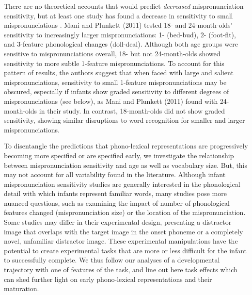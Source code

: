 \documentclass[man]{apa6}
\begin{document}
There are no theoretical accounts that would predict \emph{decreased} mispronunciation sensitivity, but at least one study has found a decrease in sensitivity to small mispronunciations . Mani and Plunkett (2011) tested 18- and 24-month-olds' sensitivity to increasingly larger mispronunciations: 1- (bed-bud), 2- (foot-fit), and 3-feature phonological changes (doll-deal). Although both age groups were sensitive to mispronunciations overall, 18- but not 24-month-olds showed sensitivity to more subtle 1-feature mispronunciations. To account for this pattern of results, the authors suggest that when faced with large and salient mispronunciations, sensitivity to small 1-feature mispronunciations may be obscured, especially if infants show graded sensitivity to different degrees of mispronunciations (see below), as Mani and Plunkett (2011) found with 24-month-olds in their study. In contrast, 18-month-olds did not show graded sensitivity, showing similar disruptions to word recognition for smaller and larger mispronunciations.

To disentangle the predictions that phono-lexical representations are progressively becoming more specified or are specified early, we investigate the relationship between mispronunciation sensitivity and age as well as vocabulary size. But, this may not account for all variability found in the literature. Although infant mispronunciation sensitivity studies are generally interested in the phonological detail with which infants represent familiar words, many studies pose more nuanced questions, such as examining the impact of number of phonological features changed (mispronunciation size) or the location of the mispronunciation. Some studies may differ in their experimental design, presenting a distractor image that overlaps with the target image in the onset phoneme or a completely novel, unfamiliar distractor image. These experimental manipulations have the potential to create experimental tasks that are more or less difficult for the infant to successfully complete. We thus follow our analyses of a developmental trajectory with one of features of the task, and line out here task effects which can shed further light on early phono-lexical representations and their maturation.
\end{document}
